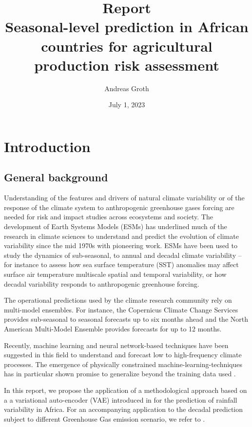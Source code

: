\documentclass[english,a4paper,10pt]{scrartcl}
\begin{document}
\title{Report\\[2ex] Seasonal-level prediction in African countries for agricultural production risk assessment}

\author{Andreas Groth}
\date{July 1, 2023}

\maketitle

\section{Introduction}

\subsection{General background}

Understanding of the features and drivers of natural climate variability or of the response of the climate system to anthropogenic greenhouse gases forcing are needed for risk and impact studies across ecosystems and society. The development of Earth Systems Models (ESMs) has underlined much of the research in climate sciences to understand and predict the evolution of climate variability since the mid 1970s with \citet{Manabe.Bryan.ea.1975} pioneering work. ESMs have been used to study the dynamics of sub-seasonal, to annual and decadal climate variability \citep{Robertson.Vitart.ea.2020} -- for instance to assess how sea surface temperature (SST) anomalies may affect surface air temperature multiscale spatial and temporal variability, or how decadal variability responds to anthropogenic greenhouse forcing.

The operational predictions used by the climate research community rely on multi-model ensembles. For instance, the Copernicus Climate Change Services \citep{C3S} provides sub-seasonal to seasonal forecasts up to six months ahead and the North American Multi-Model Ensemble \citep{NMME} provides forecasts for up to 12 months.

Recently, machine learning and neural network-based techniques have been suggested in this field to understand and forecast low to high-frequency climate processes. The emergence of physically constrained machine-learning-techniques has in particular shown promise to generalize beyond the training data used \citep{Irrgang.Boers.ea.2021,Kashinath.Mustafa.ea.2021}.

In this report, we propose the application of a methodological approach based on a a variational auto-encoder (VAE) introduced in \cite{Groth.Chavez.2023} for the prediction of rainfall variability in Africa. For an accompanying  application to the decadal prediction subject to different Greenhouse Gas emission scenario, we refer to \cite{Groth.SSP.2023}.
\end{document}
